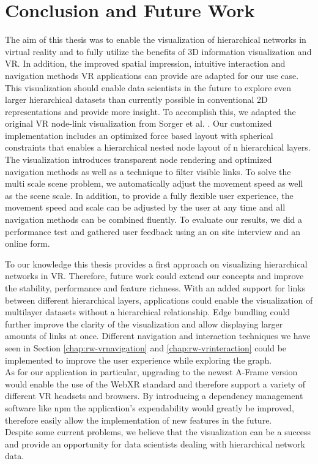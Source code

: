 \chapter{Conclusion and Future Work}
\label{chap:conclusion}

The aim of this thesis was to enable the visualization of hierarchical networks in virtual reality and to fully utilize the benefits of 3D information visualization and VR. In addition, the improved spatial impression, intuitive interaction and navigation methods VR applications can provide are adapted for our use case. 
This visualization should enable data scientists in the future to explore even larger hierarchical datasets than currently possible in conventional 2D representations and provide more insight.
To accomplish this, we adapted the original VR node-link visualization from Sorger et al. \cite{sorger_immersive_2019}. 
Our customized implementation includes an optimized force based layout with spherical constraints that enables a hierarchical nested node layout of n hierarchical layers.
The visualization introduces transparent node rendering and optimized navigation methods as well as a technique to filter visible links. 
To solve the multi scale scene problem, we automatically adjust the movement speed as well as the scene scale.
In addition, to provide a fully flexible user experience, the movement speed and scale can be adjusted by the user at any time and all navigation methods can be combined fluently.
To evaluate our results, we did a performance test and gathered user feedback using an on site interview and an online form.

To our knowledge this thesis provides a first approach on visualizing hierarchical networks in VR. Therefore, future work could extend our concepts and improve the stability, performance and feature richness.
With an added support for links between different hierarchical layers, applications could enable the visualization of multilayer datasets without a hierarchical relationship. Edge bundling could further improve the clarity of the visualization and allow displaying larger amounts of links at once. Different navigation and interaction techniques we have seen in Section \ref{chap:rw-vrnavigation} and \ref{chap:rw-vrinteraction} could be implemented to improve the user experience while exploring the graph.\
\\
As for our application in particular, upgrading to the newest A-Frame version would enable the use of the WebXR standard and therefore support a variety of different VR headsets and browsers. By introducing a dependency management software like npm the application's expendability would greatly be improved, therefore easily allow the implementation of new features in the future.
\\
Despite some current problems, we believe that the visualization can be a success and provide an opportunity for data scientists dealing with hierarchical network data.